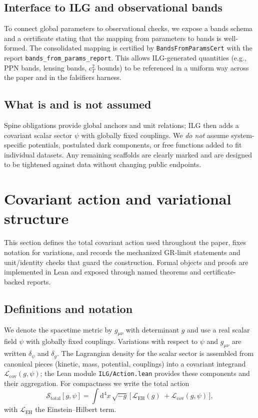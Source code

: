 \documentclass[aps,prd,twocolumn,superscriptaddress,nofootinbib,floatfix,longbibliography]{revtex4-2}
\newcommand{\dd}{\mathrm{d}}
\newcommand{\Lag}{\mathcal{L}}
\newcommand{\Action}{\mathcal{S}}
\newcommand{\lean}[1]{\texttt{#1}}
\begin{document}
\subsection{Interface to ILG and observational bands}
To connect global parameters to observational checks, we expose a bands schema and a certificate stating that the mapping from parameters to bands is well-formed. The consolidated mapping is certified by \lean{BandsFromParamsCert} with the report \lean{bands_from_params_report}. This allows ILG-generated quantities (e.g., PPN bands, lensing bands, $c_T^2$ bounds) to be referenced in a uniform way across the paper and in the falsifiers harness.

\subsection{What is and is not assumed}
Spine obligations provide global anchors and unit relations; ILG then adds a covariant scalar sector $\psi$ with globally fixed couplings. We \emph{do not} assume system-specific potentials, postulated dark components, or free functions added to fit individual datasets. Any remaining scaffolds are clearly marked and are designed to be tightened against data without changing public endpoints.

\section{Covariant action and variational structure}\label{sec:action}

This section defines the total covariant action used throughout the paper, fixes notation for variations, and records the mechanized GR-limit statements and unit/identity checks that guard the construction. Formal objects and proofs are implemented in Lean and exposed through named theorems and certificate-backed reports.

\subsection{Definitions and notation}
We denote the spacetime metric by $g_{\mu\nu}$ with determinant $g$ and use a real scalar field $\psi$ with globally fixed couplings. Variations with respect to $\psi$ and $g_{\mu\nu}$ are written $\delta_\psi$ and $\delta_g$. The Lagrangian density for the scalar sector is assembled from canonical pieces (kinetic, mass, potential, couplings) into a covariant integrand $\Lag_{\mathrm{cov}}(g,\psi)$; the Lean module \texttt{ILG/Action.lean} provides these components and their aggregation. For compactness we write the total action
\begin{equation}
  \Action_{\mathrm{total}}[g,\psi] 
  = \int \dd^4x\,\sqrt{-g}\,\Big[\,\Lag_{\mathrm{EH}}(g)\;+
    \Lag_{\mathrm{cov}}(g,\psi)\,\Big],
  \label{eq:S-total}
\end{equation}
with $\Lag_{\mathrm{EH}}$ the Einstein--Hilbert term.
\end{document}
